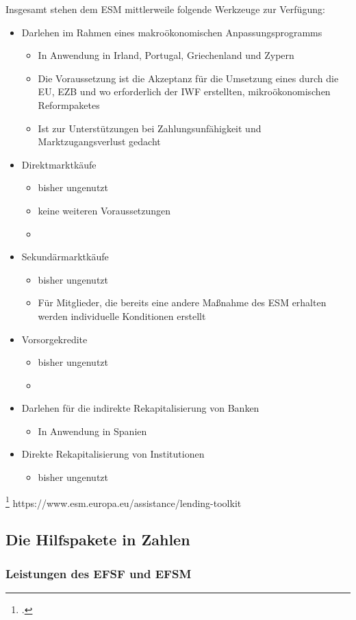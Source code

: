 Insgesamt stehen dem \gls{ESM} mittlerweile folgende Werkzeuge zur Verfügung:\begin{itemize}
  \item Darlehen im Rahmen eines makroökonomischen Anpassungsprogramms\begin{itemize}
    \item In Anwendung in Irland, Portugal, Griechenland und Zypern
  \item Die Voraussetzung ist die Akzeptanz für die Umsetzung eines durch die \gls{EU}, \gls{EZB} und wo erforderlich der \gls{IWF} erstellten, mikroökonomischen Reformpaketes
  \item Ist zur Unterstützungen bei Zahlungsunfähigkeit und Marktzugangsverlust gedacht\end{itemize}
  \item Direktmarktkäufe \begin{itemize}
    \item bisher ungenutzt
    \item keine weiteren Voraussetzungen
    \item \end{itemize}
  \item Sekundärmarktkäufe\begin{itemize}
    \item bisher ungenutzt
    \item Für Mitglieder, die bereits eine andere Maßnahme des \gls{ESM} erhalten werden individuelle Konditionen erstellt\end{itemize}
  \item Vorsorgekredite\begin{itemize}
    \item bisher ungenutzt
    \item \end{itemize}
  \item Darlehen für die indirekte Rekapitalisierung von Banken\begin{itemize}
    \item In Anwendung in Spanien\end{itemize}
  \item Direkte Rekapitalisierung von Institutionen\begin{itemize}
    \item bisher ungenutzt\end{itemize}
\end{itemize}\footcite{staab_european_2013}
https://www.esm.europa.eu/assistance/lending-toolkit

\subsection{Die Hilfspakete in Zahlen}
\subsubsection{Leistungen des EFSF und EFSM}
